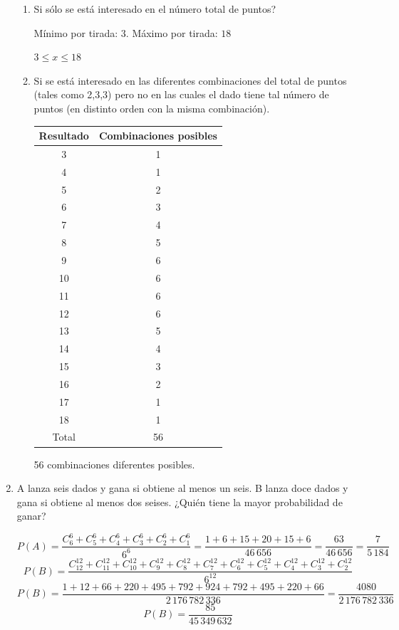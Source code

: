 \documentclass[letterpaper,11pt]{article}
\renewcommand{%
	\contentsname}{\vspace{-1cm} \hfill\bfseries\LARGE Índice \hfill \vspace{0.2cm}%
}
\begin{document}
\begin{enumerate}
\begin{enumerate}
	\item Si sólo se está interesado en el número total de puntos?
	
	Mínimo por tirada: $3$. Máximo por tirada: $18$
	
	$3 \leq x \leq 18$

	\item Si se está interesado en las diferentes combinaciones del total de puntos (tales como 2,3,3) pero no en las cuales el dado tiene tal número de puntos (en distinto orden con la misma combinación).
	
	\begin{table}[h!]
		\centering
		\begin{tabular}{|c | c |}\hline
			Resultado & Combinaciones posibles \\\hline
			3 & 1\\
			4&1\\
			5&2\\
			6&3\\
			7&4\\
			8&5\\
			9&6\\
			10&6\\
			11&6\\
			12&6\\
			13&5\\
			14&4\\
			15&3\\
			16&2\\
			17&1\\
			18&1\\\hline 
			Total & 56 \\\hline
		\end{tabular}
	\end{table}

	56 combinaciones diferentes posibles.	

\end{enumerate}

\item A lanza seis dados y gana si obtiene al menos un seis. B lanza doce dados y gana si obtiene al menos dos seises. ¿Quién tiene la mayor probabilidad de ganar?

$$
P(A)= \frac{C^6_6+C^6_5+C^6_4+C^6_3+C^6_2+C^6_1}{6^6}= \frac{1+6+15+20+15+6}{46 \, 656} = \frac{63}{46 \, 656} = \frac{7}{5 \, 184}
$$
$$
P(B)= \frac{C^{12}_{12}+C^{12}_{11}+C^{12}_{10}+C^{12}_9+C^{12}_8+C^{12}_7+C^{12}_6+C^{12}_5+C^{12}_4+C^{12}_3+C^{12}_2}{6^{12}} 
$$
$$
P(B)= \frac{1+12+66+220+495+792+924+792+495+220+66}{2 \, 176 \, 782 \, 336} = \frac{4080}{2 \, 176 \, 782 \, 336}
$$
$$
P(B)= \frac{85}{45\,349\,632} %
$$


\end{enumerate}
\end{document}
